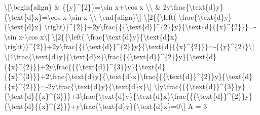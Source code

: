 \item \textbackslash{[}\textbackslash begin\{align\} \& \{\{y\}\textasciicircum\{2\}\}=\textbackslash sin
x+\textbackslash cos x \textbackslash\textbackslash{} \& 2y\textbackslash frac\{\textbackslash text\{d\}y\}\{\textbackslash text\{d\}x\}=\textbackslash cos
x-\textbackslash sin x \textbackslash\textbackslash{} \textbackslash end\{align\}\textbackslash{]}
\textbackslash{[}2\{\{\textbackslash left( \textbackslash frac\{\textbackslash text\{d\}y\}\{\textbackslash text\{d\}x\}
\textbackslash right)\}\textasciicircum\{2\}\}+2y\textbackslash frac\{\{\{\textbackslash text\{d\}\}\textasciicircum\{2\}\}y\}\{\textbackslash text\{d\}\{\{x\}\textasciicircum\{2\}\}\}=-\textbackslash sin
x-\textbackslash cos x\textbackslash{]} \textbackslash{[}2\{\{\textbackslash left(
\textbackslash frac\{\textbackslash text\{d\}y\}\{\textbackslash text\{d\}x\}
\textbackslash right)\}\textasciicircum\{2\}\}+2y\textbackslash frac\{\{\{\textbackslash text\{d\}\}\textasciicircum\{2\}\}y\}\{\textbackslash text\{d\}\{\{x\}\textasciicircum\{2\}\}\}=-\{\{y\}\textasciicircum\{2\}\}\textbackslash{]}
\textbackslash{[}4\textbackslash frac\{\textbackslash text\{d\}y\}\{\textbackslash text\{d\}x\}\textbackslash frac\{\{\{\textbackslash text\{d\}\}\textasciicircum\{2\}\}y\}\{\textbackslash text\{d\}\{\{x\}\textasciicircum\{2\}\}\}+2y\textbackslash frac\{\{\{\textbackslash text\{d\}\}\textasciicircum\{3\}\}y\}\{\textbackslash text\{d\}\{\{x\}\textasciicircum\{3\}\}\}+2\textbackslash frac\{\textbackslash text\{d\}y\}\{\textbackslash text\{d\}x\}\textbackslash frac\{\{\{\textbackslash text\{d\}\}\textasciicircum\{2\}\}y\}\{\textbackslash text\{d\}\{\{x\}\textasciicircum\{2\}\}\}=-2y\textbackslash frac\{\textbackslash text\{d\}y\}\{\textbackslash text\{d\}x\}\textbackslash{]}
\textbackslash{[}y\textbackslash frac\{\{\{\textbackslash text\{d\}\}\textasciicircum\{3\}\}y\}\{\textbackslash text\{d\}\{\{x\}\textasciicircum\{3\}\}\}+3\textbackslash frac\{\textbackslash text\{d\}y\}\{\textbackslash text\{d\}x\}\textbackslash frac\{\{\{\textbackslash text\{d\}\}\textasciicircum\{2\}\}y\}\{\textbackslash text\{d\}\{\{x\}\textasciicircum\{2\}\}\}+y\textbackslash frac\{\textbackslash text\{d\}y\}\{\textbackslash text\{d\}x\}=0\textbackslash{]}
A = 3